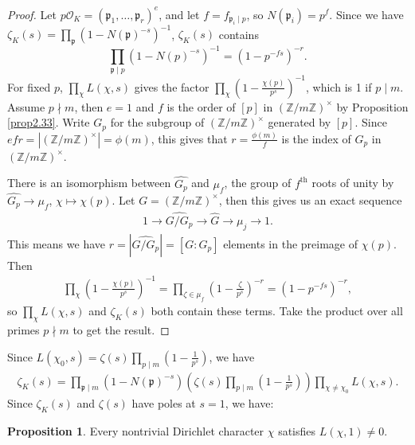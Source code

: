 \documentclass{article}
\theoremstyle{definition}
\newtheorem{prop}[theorem]{Proposition}
\begin{document}
\begin{proof}
    Let $p \mathcal{O}_K = (\mathfrak{p}_1,\ldots,\mathfrak{p}_r)^{e}$, and let $f = f_{\mathfrak{p}_i \mid p}$, so $N(\mathfrak{p}_i) = p^f$. Since we have $\zeta_K(s) = \prod_{\mathfrak{p}} (1-N(\mathfrak{p})^{-s})^{-1}$, $\zeta_K(s)$ contains $$\prod_{\mathfrak{p} \mid p}^{} (1-N(p)^{-s})^{-1} = (1-p^{-fs})^{-r}.$$
    For fixed $p$, $\prod_{\chi}^{} L(\chi,s)$ gives the factor $\prod_{\chi}^{} \left(1-\frac{\chi(p)}{p^s}\right)^{-1}$, which is 1 if $p \mid m$. Assume $p \nmid m$, then $e=1$ and $f$ is the order of $[p]$ in $(\mathbb{Z}/m\mathbb{Z})^\times$ by Proposition \ref{prop2.33}. Write $G_p$ for the subgroup of $(\mathbb{Z}/m\mathbb{Z})^\times$ generated by $[p]$. Since $efr = \left|(\mathbb{Z}/m\mathbb{Z})^\times\right| = \phi(m)$, this gives that $r = \frac{\phi(m)}{f}$ is the index of $G_p$ in $(\mathbb{Z}/m\mathbb{Z})^\times$.

    \vspace{1mm}
     
    There is an isomorphism between $\widehat{G_p}$ and $\mu_f$, the group of $f^{\text{th}}$ roots of unity by $\widehat{G_p} \to \mu_f$, $\chi \mapsto \chi(p)$. Let $G = (\mathbb{Z}/m\mathbb{Z})^\times$, then this gives us an exact sequence 
    \begin{align*}
        1 \to \widehat{G/G_p} \to \widehat{G} \to \mu_j \to 1.
    \end{align*}
    This means we have $r = \left|\widehat{G/G_p}\right| = [G:G_p]$ elements in the preimage of $\chi(p)$. Then 
    \begin{align*}
        \prod_{\chi}^{} \left(1-\frac{\chi(p)}{p^s}\right)^{-1} = \prod_{\zeta \in \mu_f}^{} \left(1-\frac{\zeta}{p^s}\right)^{-r} = (1-p^{-fs})^{-r},
    \end{align*}
    so $\prod_{\chi}^{} L(\chi,s)$ and $\zeta_K(s)$ both contain these terms. Take the product over all primes $p \nmid m$ to get the result.
\end{proof}
Since $L(\chi_0,s) = \zeta(s) \prod_{p \mid m}^{} \left(1-\frac{1}{p^s}\right)$, we have
\begin{align*}
    \zeta_K(s) = \prod_{\mathfrak{p} \mid m}^{} (1-N(\mathfrak{p})^{-s})\left(\zeta(s) \prod_{p \mid m}^{} \left(1-\frac{1}{p^s}\right)\right) \prod_{\chi \neq \chi_0}^{} L(\chi,s).
\end{align*}
Since $\zeta_K(s)$ and $\zeta(s)$ have poles at $s=1$, we have:
\begin{prop}\label{prop2.37}
    Every nontrivial Dirichlet character $\chi$ satisfies $L(\chi,1) \neq 0$.
\end{prop}
\end{document}
